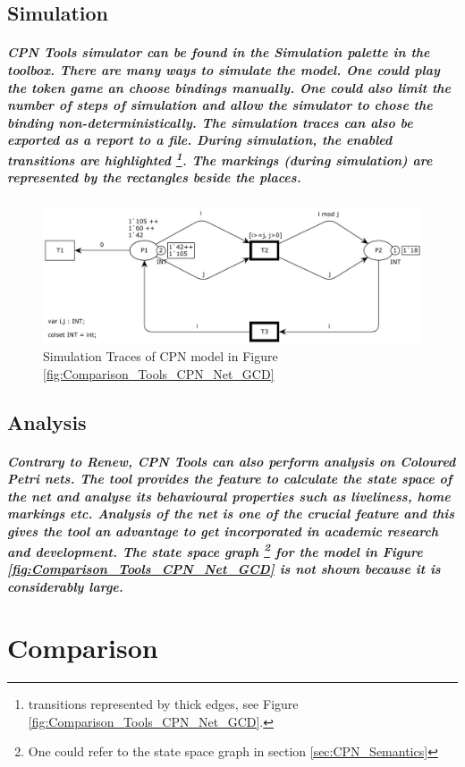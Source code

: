 \subsection*{Simulation}
\subparagraph*{\textnormal{CPN Tools simulator can be found in the \textit{Simulation} palette in the toolbox. There are many ways to simulate the model. One could play the token game an choose bindings manually. One could also limit the number of steps of simulation and allow the simulator to chose the binding non-deterministically. The simulation traces can also be exported as a report to a file. During simulation, the enabled transitions are highlighted \footnote{transitions represented by thick edges, see Figure \ref{fig:Comparison_Tools_CPN_Net_GCD}.}. The markings (during simulation) are represented by the rectangles beside the places.}}
\begin{figure}[!htbp]
	\centering
	\includegraphics[scale = 0.5]{Comparison_Tools_CPN_Sim_GCD.pdf}
	\caption{Simulation Traces of CPN model in Figure \ref{fig:Comparison_Tools_CPN_Net_GCD}}
	\label{fig:Comparison_Tools_CPN_Sim_GCD}
\end{figure}

\subsection*{Analysis}
\subparagraph*{\textnormal {Contrary to Renew, CPN Tools can also perform analysis on Coloured Petri nets. The tool provides the feature to calculate the state space of the net and analyse its behavioural properties such as liveliness, home markings etc. Analysis of the net is one of the crucial feature and this gives the tool an advantage to get incorporated in academic research and development. The state space graph \footnote{One could refer to the state space graph in section \ref{sec:CPN_Semantics}} for the model in Figure \ref{fig:Comparison_Tools_CPN_Net_GCD} is not shown because it is considerably large.}}

\section{Comparison}
\label{sec:app_comp_tools_comparison}
